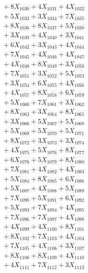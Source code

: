 \documentclass[a4paper,10pt]{article}
\begin{document}
{\begin{align}
&\;  + 8 X_{1030} + 4 X_{1031} + 4 X_{1032} \\[0.3ex]
&\;  + 5 X_{1033} + 3 X_{1034} + 7 X_{1035} \\[0.3ex]
&\;  + 8 X_{1036} + 8 X_{1037} + 5 X_{1038} \\[0.3ex]
&\;  + 3 X_{1039} + 4 X_{1040} + 3 X_{1041} \\[0.3ex]
&\;  + 6 X_{1042} + 3 X_{1043} + 4 X_{1044} \\[0.3ex]
&\;  + 7 X_{1045} + 4 X_{1046} + 4 X_{1047} \\[0.3ex]
&\;  + 4 X_{1048} + 8 X_{1049} + 3 X_{1050} \\[0.3ex]
&\;  + 7 X_{1051} + 3 X_{1052} + 5 X_{1053} \\[0.3ex]
&\;  + 3 X_{1054} + 6 X_{1055} + 4 X_{1056} \\[0.3ex]
&\;  + 4 X_{1057} + 8 X_{1058} + 6 X_{1059} \\[0.5ex]\allowbreak
&\;  + 5 X_{1060} + 7 X_{1061} + 3 X_{1062} \\[0.3ex]
&\;  + 8 X_{1063} + 3 X_{1064} + 8 X_{1065} \\[0.3ex]
&\;  + 3 X_{1066} + 5 X_{1067} + 5 X_{1068} \\[0.3ex]
&\;  + 5 X_{1069} + 5 X_{1070} + 5 X_{1071} \\[0.3ex]
&\;  + 8 X_{1072} + 3 X_{1073} + 3 X_{1074} \\[0.3ex]
&\;  + 4 X_{1075} + 5 X_{1076} + 8 X_{1077} \\[0.3ex]
&\;  + 6 X_{1078} + 5 X_{1079} + 8 X_{1080} \\[0.3ex]
&\;  + 7 X_{1081} + 4 X_{1082} + 4 X_{1083} \\[0.3ex]
&\;  + 5 X_{1084} + 8 X_{1085} + 6 X_{1086} \\[0.3ex]
&\;  + 5 X_{1087} + 4 X_{1088} + 5 X_{1089} \\[0.5ex]\allowbreak
&\;  + 7 X_{1090} + 5 X_{1091} + 6 X_{1092} \\[0.3ex]
&\;  + 5 X_{1093} + 7 X_{1094} + 4 X_{1095} \\[0.3ex]
&\;  + 7 X_{1096} + 7 X_{1097} + 4 X_{1098} \\[0.3ex]
&\;  + 4 X_{1099} + 4 X_{1100} + 8 X_{1101} \\[0.3ex]
&\;  + 8 X_{1102} + 7 X_{1103} + 4 X_{1104} \\[0.3ex]
&\;  + 7 X_{1105} + 4 X_{1106} + 3 X_{1107} \\[0.3ex]
&\;  + 8 X_{1108} + 8 X_{1109} + 4 X_{1110} \\[0.3ex]
&\;  + 4 X_{1111} + 7 X_{1112} + 3 X_{1113} \\[0.3ex]

\end{align}}
\end{document}
